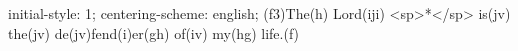 initial-style: 1;
centering-scheme: english;
(f3)The(h) Lord(iji) <sp>*</sp> is(jv) the(jv) de(jv)fend(i)er(gh) of(iv) my(hg) life.(f)
